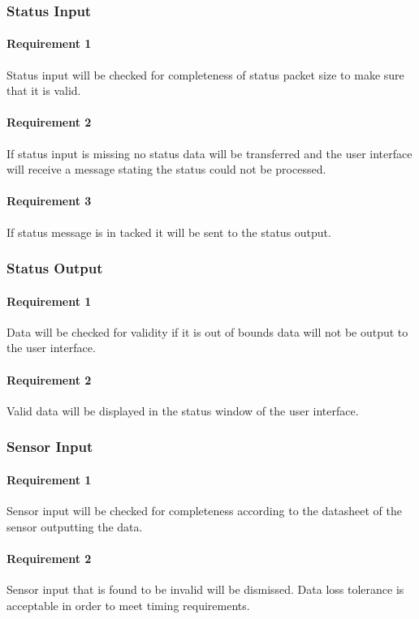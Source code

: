 \documentclass[10pt,draftclsnofoot,onecolumn,compsoc]{IEEEtran}
\begin{document}
\subsubsection{Status Input}
	\paragraph{ Requirement 1}Status input will be checked for completeness of status packet size to make sure that it is valid.\par
	\paragraph{ Requirement 2}If status input is missing no status data will be transferred and the user interface will receive a message stating the status could not be processed.\par
	\paragraph{ Requirement 3} If status message is in tacked it will be sent to the status output.\par
\subsubsection{Status Output}
	\paragraph{ Requirement 1}Data will be checked for validity if it is out of bounds data will not be output to the user interface.\par
	\paragraph{ Requirement 2}Valid data will be displayed in the status window of the user interface.\par
\subsubsection{Sensor Input}
	\paragraph{ Requirement 1}Sensor input will be checked for completeness according to the datasheet of the sensor outputting the data.\par
	\paragraph{ Requirement 2} Sensor input that is found to be invalid will be dismissed. Data loss tolerance is acceptable in order to meet timing requirements.\par
\end{document}
